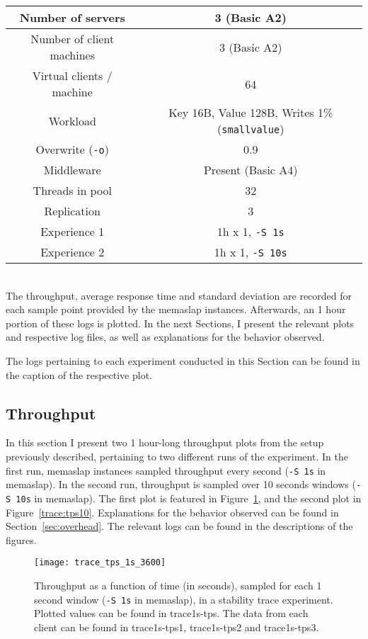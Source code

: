 \documentclass[11pt]{article}
\begin{document}
\small{
	\smallskip
	\begin{tabular}{|c|c|}
		\hline Number of servers & 3 (Basic A2) \\ 
		\hline Number of client machines & 3 (Basic A2) \\ 
		\hline Virtual clients / machine & 64 \\ 
		\hline Workload & Key 16B, Value 128B, Writes 1\% (\texttt{smallvalue}) \\
		\hline Overwrite (\texttt{-o}) & 0.9\\
		\hline Middleware & Present (Basic A4)\\ 
		\hline Threads in pool & 32\\
		\hline Replication & 3\\
		\hline Experience 1 & 1h x 1, \texttt{-S 1s} \\
		\hline Experience 2 & 1h x 1, \texttt{-S 10s} \\ 
		\hline
	\end{tabular} }\\

The throughput, average response time and standard deviation are recorded for each sample point provided by the memaslap instances. Afterwards, an 1 hour portion of these logs is plotted. In the next Sections, I present the relevant plots and respective log files, as well as explanations for the behavior observed.

The logs pertaining to each experiment conducted in this Section can be found in the caption of the respective plot.

\subsection{Throughput}\label{sec:tps}

In this section I present two 1 hour-long throughput plots from the setup previously described, pertaining to two different runs of the experiment. In the first run, memaslap instances sampled throughput every second (\texttt{-S 1s} in memaslap). In the second run, throughput is sampled over 10 seconds windows (\texttt{-S 10s} in memaslap). The first plot is featured in Figure~\ref{trace:tps1}, and the second plot in Figure~\ref{trace:tps10}. Explanations for the behavior observed can be found in Section~\ref{sec:overhead}. The relevant logs can be found in the descriptions of the figures.

\begin{figure}[H]
	\centering
	\texttt{[image: trace\_tps\_1s\_3600]}
	\caption{Throughput as a function of time (in seconds), sampled for each 1 second window (\texttt{-S 1s} in memaslap), in a stability trace experiment. Plotted values can be found in trace1s-tps. The data from each client can be found in trace1s-tps1, trace1s-tps2 and trace1s-tps3.}
	\label{trace:tps1}
\end{figure}
\end{document}
